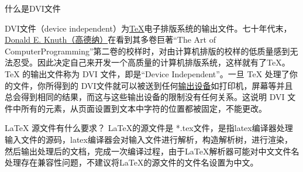 \begin{faq}{什么是DVI文件}

  DVI文件（device independent）为\href{https://baike.baidu.com/item/TeX}{TeX}电子排版系统的输出文件。七十年代末，\href{https://baike.baidu.com/item/Donald%20E.%20Knuth}{Donald E. Knuth（高德纳）}在看到其多卷巨著“The Art of ComputerProgramming”第二卷的校样时，对由计算机排版的校样的低质量感到无法忍受。因此决定自己来开发一个高质量的计算机排版系统，这样就有了TeX。TeX 的输出文件称为 DVI 文件，即是“Device Independent”。一旦 TeX 处理了你的文件，你所得到的 DVI文件就可以被送到任何\href{https://baike.baidu.com/item/%E8%BE%93%E5%87%BA%E8%AE%BE%E5%A4%87}{输出设备}如打印机，屏幕等并且总会得到相同的结果，而这与这些输出设备的限制没有任何关系。这说明 DVI 文件中所有的元素，从页面设置到文本中字符的位置都被固定，不能更改。

\end{faq}
%


\begin{faq}{\LaTeX{} 源文件有什么要求？}
  LaTeX的源文件是 *.tex文件，是指latex编译器处理输入文件的源码，latex编译器会对输入文件进行解析，构造解析树，进行渲染，然后输出处理后的文档，完成一次编译过程，由于LaTeX解析器可能对中文文件名处理存在兼容性问题，不建议将LaTeX的源文件的文件名设置为中文。
\end{faq}
